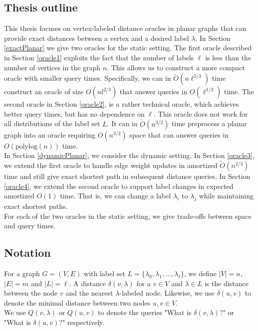 \subsection{Thesis outline}
This thesis focuses on vertex-labeled distance oracles in planar graphs that can provide
exact distances between a vertex and a desired label $\lambda$. In Section \ref{exactPlanar} we
give two oracles for the static setting. The first oracle described in Section \ref{oracle1}
exploits the fact that
the number of labels $\ell$ is less than the number of vertices in the graph $n$. This
allows us to construct a more compact oracle with smaller query times. Specifically, we
can in $\tilde{O}(n\ell^{2/3})$ time construct an oracle of size $O(nl^{2/3})$ that answer queries in
$O(\ell^{1/3})$ time. The second oracle
in Section \ref{oracle2}, is a rather technical oracle, which achieves better query times, but has no dependence
on $\ell$. This oracle does not work for all distributions of the label set $L$. It can
in $\tilde{O}(n^{3/2})$ time preprocess a planar graph into an oracle requiring $O(n^{3/2})$
space that can answer queries in $O(\text{polylog}(n))$ time. \\
In Section \ref{dynamicPlanar}, we consider the dynamic setting. In Section
\ref{oracle3}, we extend the first oracle to handle edge
weight updates in amortized $\tilde{O}(n^{2/3})$ time and still give exact shortest path in subsequent distance queries. In Section \ref{oracle4}, we extend the second oracle to support label
changes in expected amortized $O(1)$ time. That is, we can change a label $\lambda_i$ to $\lambda_j$ while maintaining
exact shortest paths. \\
For each of the two oracles in the static setting, we give trade-offs between space and
query times.

\subsection{Notation}\label{notation}
For a graph $G=(V,E)$ with label set $L=\{\lambda_0, \lambda_1, \dots, \lambda_\ell\}$, we define $|V|=n$, $|E|=m$ and $|L|=\ell$. A
distance $\delta(v,\lambda)$ for a $v\in V$ and $\lambda\in L$ is the distance between
the node $v$ and the nearest $\lambda$-labeled node. Likewise, we use $\delta(u,v)$ to denote
the minimal distance between two nodes $u,v\in V$. \\
We use $Q(v,\lambda)$ or $Q(u,v)$ to denote the queries "What is $\delta(v,\lambda)$?" or
"What is $\delta(u,v)$?" respectively. \\
